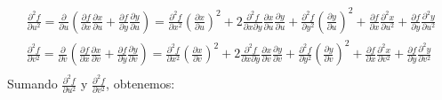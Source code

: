 \begin{enumerate}[label=\color{red}\textbf{\arabic*)}]
\[
\begin{array}{l}
  \frac{\partial^2 f}{\partial u^2} =\frac{\partial }{\partial u}\left( \frac{\partial f}{\partial x}\frac{\partial x}{\partial u} +\frac{\partial f}{\partial y} \frac{\partial y}{\partial u}  \right)  = \frac{\partial^2 f}{\partial x^2} \left( \frac{\partial x}{\partial u}  \right) ^2+2 \frac{\partial^2 f}{\partial x \partial y} \frac{\partial x}{\partial u} \frac{\partial y}{\partial u} +\frac{\partial^2 f}{\partial y^2} \left( \frac{\partial y}{\partial u}  \right) ^2+\frac{\partial f}{\partial x} \frac{\partial^2 x}{\partial u^2} +\frac{\partial f}{\partial y} \frac{\partial^2 y}{\partial u^2} \\
  \frac{\partial^2 f}{\partial v^2} =\frac{\partial }{\partial v}\left( \frac{\partial f}{\partial x}\frac{\partial x}{\partial v} +\frac{\partial f}{\partial y} \frac{\partial y}{\partial v}  \right)  = \frac{\partial^2 f}{\partial x^2} \left( \frac{\partial x}{\partial v}  \right) ^2+2 \frac{\partial^2 f}{\partial x \partial y} \frac{\partial x}{\partial v} \frac{\partial y}{\partial v} +\frac{\partial^2 f}{\partial y^2} \left( \frac{\partial y}{\partial v}  \right) ^2+\frac{\partial f}{\partial x} \frac{\partial^2 x}{\partial v^2} +\frac{\partial f}{\partial y} \frac{\partial^2 y}{\partial v^2} \\
\end{array}
\] 
Sumando $\frac{\partial^2 f}{\partial u^2} $ y $\frac{\partial^2 f}{\partial v^2} $, obtenemos: 
\end{enumerate}
